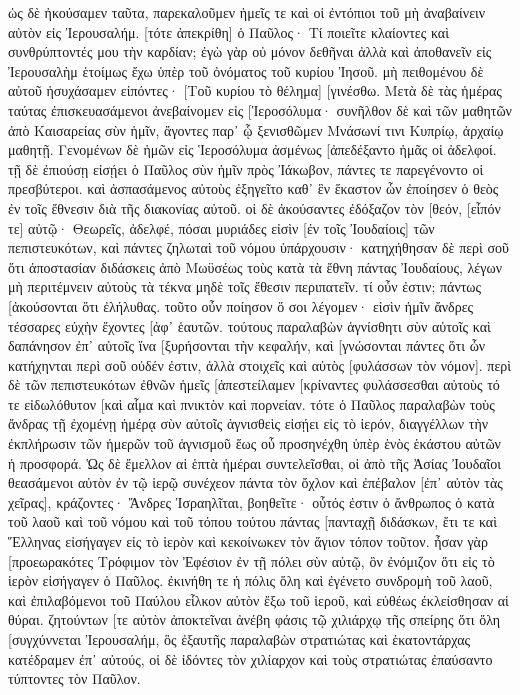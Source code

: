 ὡς δὲ ἠκούσαμεν ταῦτα, παρεκαλοῦμεν ἡμεῖς τε καὶ οἱ ἐντόπιοι τοῦ μὴ ἀναβαίνειν αὐτὸν εἰς Ἰερουσαλήμ. 
[τότε ἀπεκρίθη] ὁ Παῦλος· Τί ποιεῖτε κλαίοντες καὶ συνθρύπτοντές μου τὴν καρδίαν; ἐγὼ γὰρ οὐ μόνον δεθῆναι ἀλλὰ καὶ ἀποθανεῖν εἰς Ἰερουσαλὴμ ἑτοίμως ἔχω ὑπὲρ τοῦ ὀνόματος τοῦ κυρίου Ἰησοῦ. 
μὴ πειθομένου δὲ αὐτοῦ ἡσυχάσαμεν εἰπόντες· [Τοῦ κυρίου τὸ θέλημα] [γινέσθω. 
Μετὰ δὲ τὰς ἡμέρας ταύτας ἐπισκευασάμενοι ἀνεβαίνομεν εἰς [Ἱεροσόλυμα· 
συνῆλθον δὲ καὶ τῶν μαθητῶν ἀπὸ Καισαρείας σὺν ἡμῖν, ἄγοντες παρ᾽ ᾧ ξενισθῶμεν Μνάσωνί τινι Κυπρίῳ, ἀρχαίῳ μαθητῇ. 
Γενομένων δὲ ἡμῶν εἰς Ἱεροσόλυμα ἀσμένως [ἀπεδέξαντο ἡμᾶς οἱ ἀδελφοί. 
τῇ δὲ ἐπιούσῃ εἰσῄει ὁ Παῦλος σὺν ἡμῖν πρὸς Ἰάκωβον, πάντες τε παρεγένοντο οἱ πρεσβύτεροι. 
καὶ ἀσπασάμενος αὐτοὺς ἐξηγεῖτο καθ᾽ ἓν ἕκαστον ὧν ἐποίησεν ὁ θεὸς ἐν τοῖς ἔθνεσιν διὰ τῆς διακονίας αὐτοῦ. 
οἱ δὲ ἀκούσαντες ἐδόξαζον τὸν [θεόν, [εἶπόν τε] αὐτῷ· Θεωρεῖς, ἀδελφέ, πόσαι μυριάδες εἰσὶν [ἐν τοῖς Ἰουδαίοις] τῶν πεπιστευκότων, καὶ πάντες ζηλωταὶ τοῦ νόμου ὑπάρχουσιν· 
κατηχήθησαν δὲ περὶ σοῦ ὅτι ἀποστασίαν διδάσκεις ἀπὸ Μωϋσέως τοὺς κατὰ τὰ ἔθνη πάντας Ἰουδαίους, λέγων μὴ περιτέμνειν αὐτοὺς τὰ τέκνα μηδὲ τοῖς ἔθεσιν περιπατεῖν. 
τί οὖν ἐστιν; πάντως [ἀκούσονται ὅτι ἐλήλυθας. 
τοῦτο οὖν ποίησον ὅ σοι λέγομεν· εἰσὶν ἡμῖν ἄνδρες τέσσαρες εὐχὴν ἔχοντες [ἀφ᾽ ἑαυτῶν. 
τούτους παραλαβὼν ἁγνίσθητι σὺν αὐτοῖς καὶ δαπάνησον ἐπ᾽ αὐτοῖς ἵνα [ξυρήσονται τὴν κεφαλήν, καὶ [γνώσονται πάντες ὅτι ὧν κατήχηνται περὶ σοῦ οὐδέν ἐστιν, ἀλλὰ στοιχεῖς καὶ αὐτὸς [φυλάσσων τὸν νόμον]. 
περὶ δὲ τῶν πεπιστευκότων ἐθνῶν ἡμεῖς [ἀπεστείλαμεν [κρίναντες φυλάσσεσθαι αὐτοὺς τό τε εἰδωλόθυτον [καὶ αἷμα καὶ πνικτὸν καὶ πορνείαν. 
τότε ὁ Παῦλος παραλαβὼν τοὺς ἄνδρας τῇ ἐχομένῃ ἡμέρᾳ σὺν αὐτοῖς ἁγνισθεὶς εἰσῄει εἰς τὸ ἱερόν, διαγγέλλων τὴν ἐκπλήρωσιν τῶν ἡμερῶν τοῦ ἁγνισμοῦ ἕως οὗ προσηνέχθη ὑπὲρ ἑνὸς ἑκάστου αὐτῶν ἡ προσφορά. 
Ὡς δὲ ἔμελλον αἱ ἑπτὰ ἡμέραι συντελεῖσθαι, οἱ ἀπὸ τῆς Ἀσίας Ἰουδαῖοι θεασάμενοι αὐτὸν ἐν τῷ ἱερῷ συνέχεον πάντα τὸν ὄχλον καὶ ἐπέβαλον [ἐπ᾽ αὐτὸν τὰς χεῖρας], 
κράζοντες· Ἄνδρες Ἰσραηλῖται, βοηθεῖτε· οὗτός ἐστιν ὁ ἄνθρωπος ὁ κατὰ τοῦ λαοῦ καὶ τοῦ νόμου καὶ τοῦ τόπου τούτου πάντας [πανταχῇ διδάσκων, ἔτι τε καὶ Ἕλληνας εἰσήγαγεν εἰς τὸ ἱερὸν καὶ κεκοίνωκεν τὸν ἅγιον τόπον τοῦτον. 
ἦσαν γὰρ [προεωρακότες Τρόφιμον τὸν Ἐφέσιον ἐν τῇ πόλει σὺν αὐτῷ, ὃν ἐνόμιζον ὅτι εἰς τὸ ἱερὸν εἰσήγαγεν ὁ Παῦλος. 
ἐκινήθη τε ἡ πόλις ὅλη καὶ ἐγένετο συνδρομὴ τοῦ λαοῦ, καὶ ἐπιλαβόμενοι τοῦ Παύλου εἷλκον αὐτὸν ἔξω τοῦ ἱεροῦ, καὶ εὐθέως ἐκλείσθησαν αἱ θύραι. 
ζητούντων [τε αὐτὸν ἀποκτεῖναι ἀνέβη φάσις τῷ χιλιάρχῳ τῆς σπείρης ὅτι ὅλη [συγχύννεται Ἰερουσαλήμ, 
ὃς ἐξαυτῆς παραλαβὼν στρατιώτας καὶ ἑκατοντάρχας κατέδραμεν ἐπ᾽ αὐτούς, οἱ δὲ ἰδόντες τὸν χιλίαρχον καὶ τοὺς στρατιώτας ἐπαύσαντο τύπτοντες τὸν Παῦλον. 
